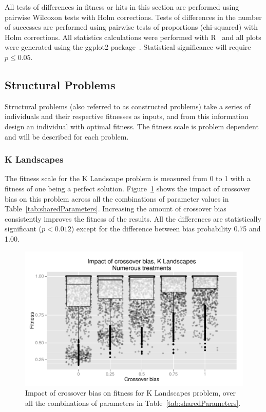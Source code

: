 \documentclass{sig-alternate}
\begin{document}
All tests of differences in fitness or hits in this section are performed using pairwise Wilcoxon tests with Holm
corrections. Tests of differences in the number of successes are performed using pairwise tests of proportions
(chi-squared) with Holm corrections. All statistics calculations were performed with R~\cite{R} and all plots were
generated using the ggplot2 package~\cite{ggplot2Book}. Statistical significance will require $p \leq 0.05$.

\subsection{Structural Problems}

Structural problems (also referred to as constructed problems) take a series of individuals and their respective
fitnesses as inputs, and from this information design an individual with optimal fitness. The fitness scale is problem dependent and will be described for each problem.

\subsubsection{K Landscapes}

The fitness scale for the K Landscape problem is measured from 0 to 1 with a fitness of one being a perfect solution.
Figure~\ref{fig:KLandscapes6_results} shows the impact of crossover bias on this problem across all the combinations of
parameter values in Table~\ref{tab:sharedParameters}. Increasing the amount of crossover bias consistently improves the
fitness of the results. All the differences are statistically significant ($p < 0.012$) except for the difference
between bias probability 0.75 and 1.00.

%
%
%
%

\begin{figure}
\centering
\includegraphics[width=0.45 \textwidth]{Plots/KLandscapes6_XO_bias_impact_transformed_boxplot_alpha075.pdf}
\caption{Impact of crossover bias on fitness for K Landscapes problem, over all the combinations of 
	parameters in Table~\ref{tab:sharedParameters}.}
\label{fig:KLandscapes6_results}
\end{figure}
\end{document}
